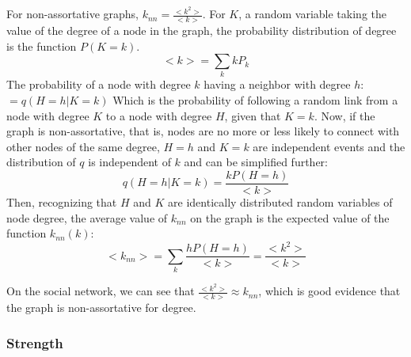 \documentclass[12pt]{article}
\begin{document}
For non-assortative graphs, \(k_{nn} = \frac{<k^2>}{<k>}\).
For \(K\), a random variable taking the value of the degree of a node in the graph, the probability distribution of degree is the function \(P(K = k)\).
\[<k> = \sum_k kP_k\]
The probability of a node with degree \(k\) having a neighbor with degree \(h\): \( = q(H = h | K = k)\)
Which is the probability of following a random link from a node with degree \(K\) to a node with degree \(H\), given that \(K = k\). Now, if  the graph is non-assortative, that is, nodes are no more or less likely to connect with other nodes of the same degree, \(H = h\) and \(K = k\) are independent events and the distribution of \(q\) is independent of \(k\) and can be simplified further:
\[ q(H = h | K = k) = \frac{ k P(H = h)}{<k>}\]
Then, recognizing that \(H\) and \(K\) are identically distributed random variables of node degree, the average value of \(k_{nn}\) on the graph is the expected value of the function \(k_{nn}(k)\):
\[<k_{nn}> = \sum_{k} \frac{ h P(H = h)}{<k>} =  \frac{<k^2>}{<k>}  \]

On the social network, we can see that \(\frac{<k^2>}{<k>} \approx k_{nn}\), which is good evidence that the graph is non-assortative for degree.

\subsubsection*{Strength}
\end{document}
